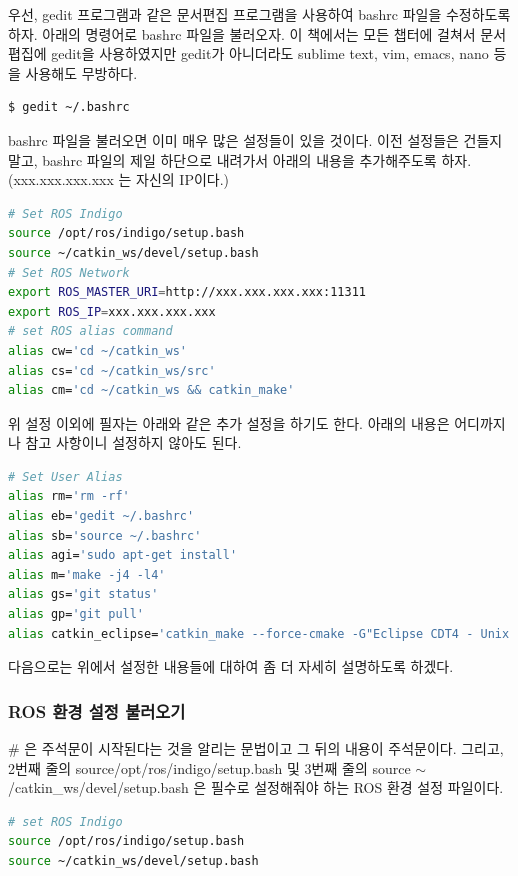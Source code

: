 우선, gedit 프로그램과 같은 문서편집 프로그램을 사용하여 bashrc 파일을 수정하도록 하자. 아래의 명령어로 bashrc 파일을 불러오자. 이 책에서는 모든 챕터에 걸쳐서 문서폅집에 gedit을 사용하였지만 gedit가 아니더라도 sublime text, vim, emacs, nano 등을 사용해도 무방하다.
\\
\begin{lstlisting}[language=ROS]
$ gedit ~/.bashrc
\end{lstlisting}

bashrc 파일을 불러오면 이미 매우 많은 설정들이 있을 것이다. 이전 설정들은 건들지 말고, bashrc 파일의 제일 하단으로 내려가서 아래의 내용을 추가해주도록 하자. (xxx.xxx.xxx.xxx 는 자신의 IP이다.)
\\
\begin{lstlisting}[language=bash]
# Set ROS Indigo
source /opt/ros/indigo/setup.bash
source ~/catkin_ws/devel/setup.bash
# Set ROS Network
export ROS_MASTER_URI=http://xxx.xxx.xxx.xxx:11311
export ROS_IP=xxx.xxx.xxx.xxx
# set ROS alias command
alias cw='cd ~/catkin_ws'
alias cs='cd ~/catkin_ws/src'
alias cm='cd ~/catkin_ws && catkin_make'
\end{lstlisting}

위 설정 이외에 필자는 아래와 같은 추가 설정을 하기도 한다. 아래의 내용은 어디까지나 참고 사항이니 설정하지 않아도 된다.
\\
\begin{lstlisting}[language=bash]
# Set User Alias
alias rm='rm -rf' 
alias eb='gedit ~/.bashrc' 
alias sb='source ~/.bashrc'
alias agi='sudo apt-get install'  
alias m='make -j4 -l4'  
alias gs='git status'  
alias gp='git pull'
alias catkin_eclipse='catkin_make --force-cmake -G"Eclipse CDT4 - Unix Makefiles"'
\end{lstlisting}

\noindent
다음으로는 위에서 설정한 내용들에 대하여 좀 더 자세히 설명하도록 하겠다.

\subsubsection{ROS 환경 설정 불러오기}
\# 은 주석문이 시작된다는 것을 알리는 문법이고 그 뒤의 내용이 주석문이다. 그리고, 2번째 줄의 source/opt/ros/indigo/setup.bash 및 3번째 줄의 source $\sim$/catkin\_ws/devel/setup.bash 은 필수로 설정해줘야 하는 ROS 환경 설정 파일이다.
\\
\begin{lstlisting}[language=bash]
# set ROS Indigo
source /opt/ros/indigo/setup.bash
source ~/catkin_ws/devel/setup.bash
\end{lstlisting}

